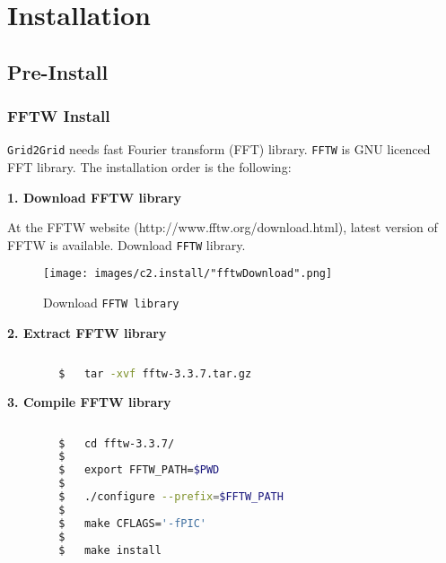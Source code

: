 \pagebreak
	\section{Installation}
	
		\subsection{Pre-Install}
		
		\subsubsection{FFTW Install}
		
		\label{chap:FFTWInstall}
		
		\texttt{Grid2Grid} needs fast Fourier transform (FFT) library. \texttt{FFTW} is GNU licenced FFT library. The installation order is the following:
		
		\vspace{0.5cm}
		
		\textbf{1. Download FFTW library}
		
		At the FFTW website (http://www.fftw.org/download.html), latest version of FFTW is available. Download \texttt{FFTW} library. 
		
		\vspace{0.5cm}
		{
			\begin{figure} [H]
				\centering
				\begin{tcolorbox}[standard jigsaw,opacityback=0]
				\texttt{[image: images/c2.install/"fftwDownload".png]}
				\end{tcolorbox}
				\vspace{0.3cm}
				\caption{Download \texttt{FFTW library}}			
				\label{fig:vol2volStructure}
			\end{figure}
		}
		
		\pagebreak
		
		\textbf{2. Extract FFTW library}

		
		\begin{lstlisting}[language=bash]
		
		$	tar -xvf fftw-3.3.7.tar.gz
		\end{lstlisting}
		
		\vspace{0.5cm}
		\textbf{3. Compile FFTW library}
		
		\begin{lstlisting}[language=bash]
		
		$	cd fftw-3.3.7/
		$
		$	export FFTW_PATH=$PWD
		$
		$	./configure --prefix=$FFTW_PATH		
		$
		$	make CFLAGS='-fPIC'
		$
		$	make install
		\end{lstlisting}
		
